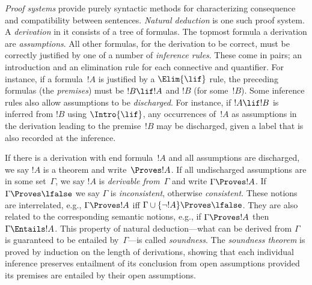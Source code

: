 \emph{Proof systems} provide purely syntactic methods for
characterizing consequence and compatibility between sentences.
\emph{Natural deduction} is one such proof system. A \emph{derivation}
in it consists of a tree of formulas. The topmost formula a derivation
are \emph{assumptions}. All other formulas, for the derivation to be
correct, must be correctly justified by one of a number of
\emph{inference rules}. These come in pairs; an introduction and an
elimination rule for each connective and quantifier. For instance, if
a formula~$!A$ is justified by a $\Elim{\lif}$ rule, the preceding
formulas (the \emph{premises}) must be $!B \lif !A$ and $!B$ (for
some~$!B$).  Some inference rules also allow assumptions to be
\emph{discharged}. For instance, if $!A \lif !B$ is inferred from $!B$
using $\Intro{\lif}$, any occurrences of~$!A$ as assumptions in the
derivation leading to the premise~$!B$ may be discharged, given a
label that is also recorded at the inference.

If there is a derivation with end formula~$!A$ and all assumptions are
discharged, we say $!A$ is a theorem and write~$\Proves !A$.  If all
undischarged assumptions are in some set~$\Gamma$, we say $!A$ is
\emph{derivable from}~$\Gamma$ and write $\Gamma \Proves !A$. If
$\Gamma \Proves \lfalse$ we say $\Gamma$ is \emph{inconsistent},
otherwise \emph{consistent}.  These notions are interrelated, e.g.,
$\Gamma \Proves !A$ iff $\Gamma \cup \{\lnot !A\} \Proves
\lfalse$. They are also related to the corresponding semantic notions,
e.g., if $\Gamma \Proves !A$ then $\Gamma \Entails !A$. This property
of natural deduction---what can be derived from $\Gamma$ is guaranteed
to be entailed by~$\Gamma$---is called \emph{soundness}. The
\emph{soundness theorem} is proved by induction on the length of
derivations, showing that each individual inference preserves
entailment of its conclusion from open assumptions provided its premises are
entailed by their open assumptions.
